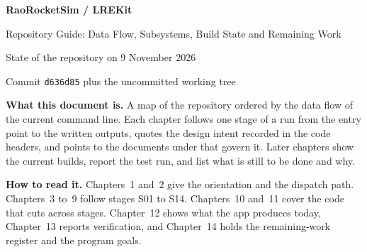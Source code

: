 \begin{titlepage}
\vspace*{3cm}
{\sffamily\bfseries\Huge RaoRocketSim / LREKit\par}
\vspace{0.6cm}
{\sffamily\Large Repository Guide: Data Flow, Subsystems, Build State and Remaining Work\par}
\vspace{1.2cm}
{\large State of the repository on 9 November 2026\par}
{\large Commit \texttt{d636d85} plus the uncommitted working tree\par}
\vfill
\noindent\textbf{What this document is.} A map of the repository ordered by the data flow of the current command line. Each chapter follows one stage of a run from the entry point to the written outputs, quotes the design intent recorded in the code headers, and points to the documents under  that govern it. Later chapters show the current builds, report the test run, and list what is still to be done and why.
\par\medskip
\noindent\textbf{How to read it.} Chapters~1 and~2 give the orientation and the dispatch path. Chapters~3 to~9 follow stages S01 to S14. Chapters~10 and~11 cover the code that cuts across stages. Chapter~12 shows what the app produces today, Chapter~13 reports verification, and Chapter~14 holds the remaining-work register and the program goals.
\end{titlepage}
